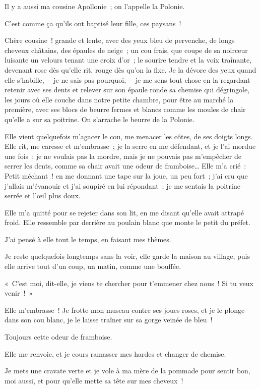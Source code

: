 \documentclass[french,twoside]{book} %
\begin{document}
Il y a aussi ma cousine Apollonie ; on l’appelle la Polonie.\par
C’est comme ça qu’ils ont baptisé leur fille, ces paysans !\par
Chère cousine ! grande et lente, avec des yeux bleu de pervenche, de longs cheveux châtains, des épaules de neige ; un cou frais, que coupe de sa noirceur luisante un velours tenant une croix d’or ; le sourire tendre et la voix traînante, devenant rose dès qu’elle rit, rouge dès qu’on la fixe. Je la dévore des yeux quand elle s’habille, – je ne sais pas pourquoi, – je me sens tout chose en la regardant retenir avec ses dents et relever sur son épaule ronde sa chemise qui dégringole, les jours où elle couche dans notre petite chambre, pour être au marché la première, avec ses blocs de beurre fermes et blancs comme les moules de chair qu’elle a sur sa poitrine. On s’arrache le beurre de la Polonie.\par
Elle vient quelquefois m’agacer le cou, me menacer les côtes, de ses doigts longs. Elle rit, me caresse et m’embrasse ; je la serre en me défendant, et je l’ai mordue une fois ; je ne voulais pas la mordre, mais je ne pouvais pas m’empêcher de serrer les dents, comme sa chair avait une odeur de framboise… Elle m’a crié : Petit méchant ! en me donnant une tape sur la joue, un peu fort ; j’ai cru que j’allais m’évanouir et j’ai soupiré en lui répondant ; je me sentais la poitrine serrée et l’œil plus doux.\par
Elle m’a quitté pour se rejeter dans son lit, en me disant qu’elle avait attrapé froid. Elle ressemble par derrière au poulain blanc que monte le petit du préfet.\par
J’ai pensé à elle tout le temps, en faisant mes thèmes.\par
\bigbreak
\noindent Je reste quelquefois longtemps sans la voir, elle garde la maison au village, puis elle arrive tout d’un coup, un matin, comme une bouffée.\par
« C’est moi, dit-elle, je viens te chercher pour t’emmener chez nous ! Si tu veux venir ! »\par
Elle m’embrasse ! Je frotte mon museau contre ses joues roses, et je le plonge dans son cou blanc, je le laisse traîner sur sa gorge veinée de bleu !\par
Toujours cette odeur de framboise.\par
Elle me renvoie, et je cours ramasser mes hardes et changer de chemise.\par
Je mets une cravate verte et je vole à ma mère de la pommade pour sentir bon, moi aussi, et pour qu’elle mette sa tête sur mes cheveux !\par
\end{document}
